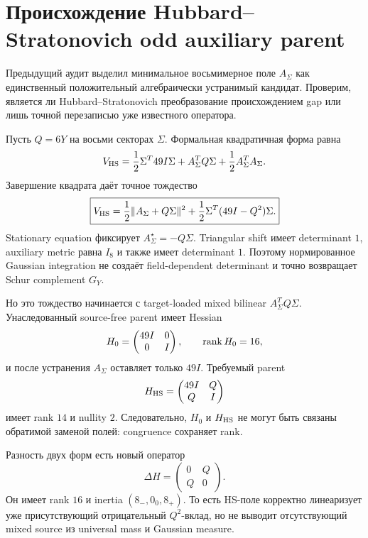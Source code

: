 \chapter{Происхождение Hubbard--Stratonovich odd auxiliary parent}
\label{ch:v10-h15-r2-hubbard-stratonovich-parent}

Предыдущий аудит выделил минимальное восьмимерное поле $A_\Sigma$ как
единственный положительный алгебраически устранимый кандидат. Проверим,
является ли Hubbard--Stratonovich преобразование происхождением gap или
лишь точной перезаписью уже известного оператора.

Пусть $Q=6Y$ на восьми секторах $\Sigma$. Формальная квадратичная форма
равна
\begin{equation}
 V_{\rm HS}=\frac12\Sigma^T49I\Sigma+A_\Sigma^TQ\Sigma
 +\frac12A_\Sigma^TA_\Sigma.
\end{equation}
Завершение квадрата даёт точное тождество
\begin{equation}
 \boxed{V_{\rm HS}=\frac12\|A_\Sigma+Q\Sigma\|^2
 +\frac12\Sigma^T(49I-Q^2)\Sigma.}
\end{equation}
Stationary equation фиксирует $A_\Sigma^\star=-Q\Sigma$. Triangular shift
имеет determinant $1$, auxiliary metric равна $I_8$ и также имеет
determinant $1$. Поэтому нормированное Gaussian integration не создаёт
field-dependent determinant и точно возвращает Schur complement $G_Y$.

Но это тождество начинается с target-loaded mixed bilinear
$A_\Sigma^TQ\Sigma$. Унаследованный source-free parent имеет Hessian
\begin{equation}
 H_0=\begin{pmatrix}49I&0\\0&I\end{pmatrix},
 \qquad \operatorname{rank} H_0=16,
\end{equation}
и после устранения $A_\Sigma$ оставляет только $49I$. Требуемый parent
\begin{equation}
 H_{\rm HS}=\begin{pmatrix}49I&Q\\Q&I\end{pmatrix}
\end{equation}
имеет rank $14$ и nullity $2$. Следовательно, $H_0$ и $H_{\rm HS}$ не
могут быть связаны обратимой заменой полей: congruence сохраняет rank.

Разность двух форм есть новый оператор
\begin{equation}
 \Delta H=\begin{pmatrix}0&Q\\Q&0\end{pmatrix}.
\end{equation}
Он имеет rank $16$ и inertia $(8_-,0_0,8_+)$. То есть HS-поле корректно
линеаризует уже присутствующий отрицательный $Q^2$-вклад, но не выводит
отсутствующий mixed source из universal mass и Gaussian measure.

